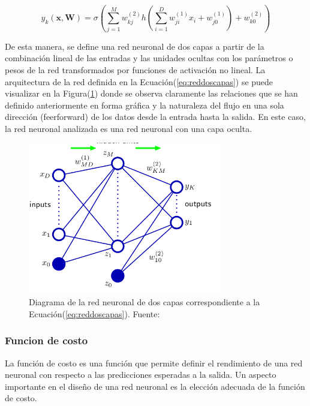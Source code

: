         \begin{equation}\label{eq:reddoscapas}
            y_k(\mathbf{x}, \mathbf{W}) = \sigma \left( \sum_{j=1}^M w_{kj}^{(2)} h \left( \sum_{i=1}^D w_{ji}^{(1)} x_i + w_{j0}^{(1)} \right) + w_{k0}^{(2)} \right)
        \end{equation}

        De esta manera, se define una red neuronal de dos capas a partir de la combinación lineal de las entradas y las unidades 
        ocultas con los parámetros o pesos de la red transformados por funciones de activación no lineal. La arquitectura de la 
        red definida en la Ecuación(\ref{eq:reddoscapas}) se puede visualizar en la Figura(\ref{fig:reddoscapas}) donde se observa claramente las relaciones que se 
        han definido anteriormente en forma gráfica y la naturaleza del flujo en una sola dirección (feerforward) de los datos 
        desde la entrada hasta la salida. En este caso, la red neuronal analizada es una red neuronal con una capa oculta.

        \begin{figure}[!h] 
            \centering
            \includegraphics[width=0.75\textwidth]{img/reddoscapas}
            \caption[Diagrama de una red neuronal de dos capas]{Diagrama de la red neuronal de dos capas correspondiente a la Ecuación(\ref{eq:reddoscapas}). Fuente: \cite{Bishop2006} }
            \label{fig:reddoscapas}
        \end{figure}
        
        \subsubsection{Funcion de costo}
        La función de costo es una función que permite definir el rendimiento de una red neuronal con respecto a las 
        predicciones esperadas a la salida. Un aspecto importante en el diseño de una red neuronal es la elección adecuada 
        de la función de costo. 

